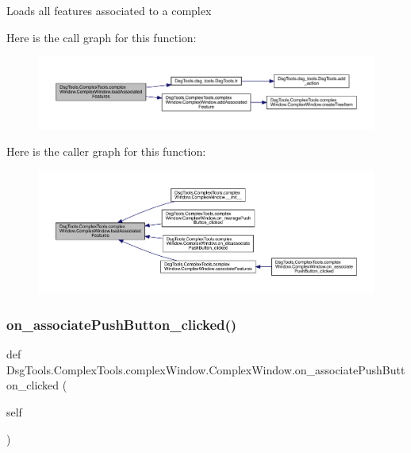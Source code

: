 \begin{DoxyVerb}Loads all features associated to a complex
\end{DoxyVerb}
 Here is the call graph for this function\+:
\nopagebreak
\begin{figure}[H]
\begin{center}
\leavevmode
\includegraphics[width=350pt]{class_dsg_tools_1_1_complex_tools_1_1complex_window_1_1_complex_window_adb4536abecc18bd3ed9915d879a72337_cgraph}
\end{center}
\end{figure}
Here is the caller graph for this function\+:
\nopagebreak
\begin{figure}[H]
\begin{center}
\leavevmode
\includegraphics[width=350pt]{class_dsg_tools_1_1_complex_tools_1_1complex_window_1_1_complex_window_adb4536abecc18bd3ed9915d879a72337_icgraph}
\end{center}
\end{figure}
\mbox{\label{class_dsg_tools_1_1_complex_tools_1_1complex_window_1_1_complex_window_a38d766c9c5d37678bcbf0018f2d13a1c}} 
\subsubsection{\texorpdfstring{on\+\_\+associate\+Push\+Button\+\_\+clicked()}{on\_associatePushButton\_clicked()}}
{\footnotesize\ttfamily def Dsg\+Tools.\+Complex\+Tools.\+complex\+Window.\+Complex\+Window.\+on\+\_\+associate\+Push\+Button\+\_\+clicked (\begin{DoxyParamCaption}\item[{}]{self }\end{DoxyParamCaption})}

